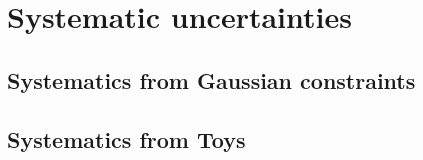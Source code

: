 \chapter{Systematic uncertainties}
\label{ch:systeamticUncerts}

\blindtext

\section{Systematics from Gaussian constraints}

\Blindtext

\section{Systematics from Toys}

\Blindtext
